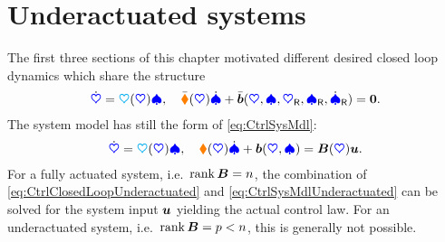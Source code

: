 \section{Underactuated systems}\label{sec:CtrlUnderactuated}
The first three sections of this chapter motivated different desired closed loop dynamics which share the structure
\begin{align}\label{eq:CtrlClosedLoopUnderactuated}
 \sysCoordd = \kinMat(\sysCoord) \sysVel, 
\quad
 \sysInertiaMatC(\sysCoord) \sysVeld + \sysForceC(\sysCoord, \sysVel, \sysCoordR, \sysVelR, \sysVelRd) = \tuple{0}.
\end{align}
The system model has still the form of \eqref{eq:CtrlSysMdl}:
\begin{align}\label{eq:CtrlSysMdlUnderactuated}
 \sysCoordd = \kinMat(\sysCoord) \sysVel, 
\quad
 \sysInertiaMat(\sysCoord) \sysVeld + \sysForce(\sysCoord, \sysVel) = \sysInputMat(\sysCoord) \sysInput.
\end{align}
For a fully actuated system, i.e.\ $\rank\sysInputMat = \dimConfigSpace$, the combination of \eqref{eq:CtrlClosedLoopUnderactuated} and \eqref{eq:CtrlSysMdlUnderactuated} can be solved for the system input $\sysInput$ yielding the actual control law.
For an underactuated system, i.e.\ $\rank\sysInputMat = \numInputs < \dimConfigSpace$, this is generally not possible.



